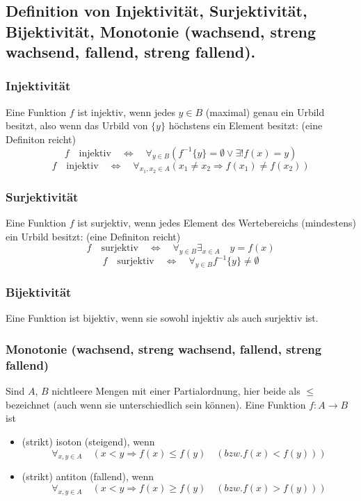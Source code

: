 \subsection{Definition von Injektivität, Surjektivität, Bijektivität, Monotonie (wachsend, streng wachsend, fallend, streng fallend).}

\subsubsection{Injektivität}
Eine Funktion $f$ ist injektiv, wenn jedes $y \in B$ (maximal) genau ein Urbild besitzt, also wenn das Urbild von $\{y\}$ höchstens ein Element besitzt: (eine Definiton reicht)
$$f \quad \text{injektiv} \quad \Leftrightarrow \quad \forall_{y \in B} (f^{-1}\{y\} = \emptyset \vee \exists! f(x) = y )$$
$$f \quad \text{injektiv} \quad \Leftrightarrow \quad \forall_{x_1, x_2 \in A} (x_1 \neq x_2 \Rightarrow f(x_1) \neq f(x_2))$$

\subsubsection{Surjektivität}
Eine Funktion $f$ ist surjektiv, wenn jedes Element des Wertebereichs (mindestens) ein Urbild besitzt: (eine Definiton reicht)
$$f \quad \text{surjektiv} \quad \Leftrightarrow \quad \forall_{y \in B} \exists_{x \in A} \quad y = f(x)$$
$$f \quad \text{surjektiv} \quad \Leftrightarrow \quad \forall_{y \in B} f^{-1} \{y\} \neq \emptyset$$

\subsubsection{Bijektivität}
Eine Funktion ist bijektiv, wenn sie sowohl injektiv als auch surjektiv ist.

\subsubsection{Monotonie (wachsend, streng wachsend, fallend, streng fallend)}
Sind $A$, $B$ nichtleere Mengen mit einer Partialordnung, hier beide als $\leq$ bezeichnet (auch wenn sie unterschiedlich sein können). Eine Funktion $f: A \longrightarrow B$ ist

\begin{itemize}
\item (strikt) isoton (steigend), wenn $$\forall_{x,y \in A} \quad (x < y \Rightarrow f(x) \leq f(y) \quad (bzw. f(x) < f(y)))$$
\item (strikt) antiton (fallend), wenn $$\forall_{x,y \in A} \quad (x < y \Rightarrow f(x) \geq f(y) \quad (bzw. f(x) > f(y)))$$
\end{itemize}

